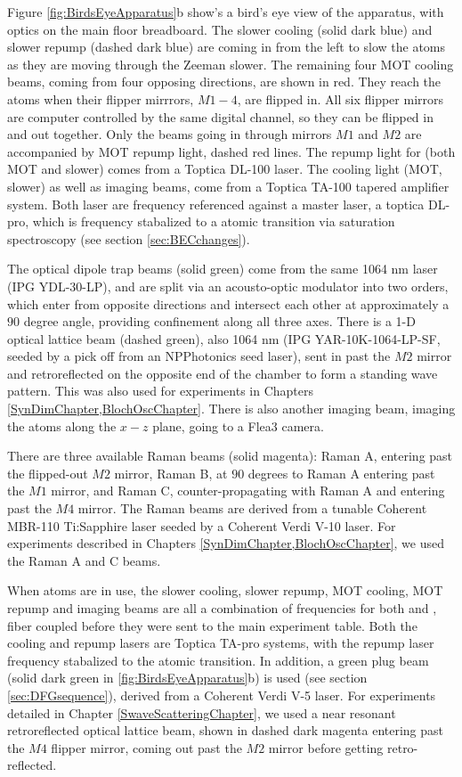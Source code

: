 Figure \ref{fig:BirdsEyeApparatus}b show's a bird's eye view of the apparatus, with optics on the main floor breadboard. The slower cooling (solid dark blue) and slower repump (dashed dark blue) are coming in from the left to slow the atoms as they are moving through the Zeeman slower. The remaining four MOT cooling beams, coming from four opposing directions, are shown in red.  They reach the atoms when their flipper mirrrors, $M1-4$, are flipped in. All six flipper mirrors are computer controlled by the same digital channel, so they can be flipped in and out together. Only the beams going in through mirrors $M1$ and $M2$ are accompanied by MOT repump light, dashed red lines. The repump light for \Rb{} (both MOT and slower) comes from a Toptica DL-100 laser. The cooling light (MOT, slower) as well as imaging beams, come from a Toptica TA-100 tapered amplifier system. Both laser are frequency referenced against a master laser, a toptica DL-pro, which is frequency stabalized to a \Rb{} atomic transition via saturation spectroscopy (see section \ref{sec:BECchanges}).

The optical dipole trap beams (solid green) come from the same 1064 nm laser (IPG YDL-30-LP), and are split via an acousto-optic modulator into two orders, which enter from opposite directions and intersect each other at approximately a $90$ degree angle, providing confinement along all three axes.  There is a 1-D optical lattice beam (dashed green), also 1064 nm (IPG YAR-10K-1064-LP-SF, seeded by a pick off from an NPPhotonics seed laser), sent in past the $M2$ mirror and retroreflected on the opposite end of the chamber to form a standing wave pattern. This was also used for experiments in Chapters \ref{SynDimChapter,BlochOscChapter}. There is also another imaging beam, imaging the atoms along the $x-z$ plane, going to a Flea3 camera. 

There are three available Raman beams (solid magenta): Raman A, entering past the flipped-out $M2$ mirror, Raman B, at $90$ degrees to Raman A entering past the $M1$ mirror, and Raman C, counter-propagating with Raman A and entering past the $M4$ mirror. The Raman beams are derived from a tunable Coherent MBR-110 Ti:Sapphire laser seeded by a Coherent Verdi V-10 laser. For experiments described in Chapters \ref{SynDimChapter,BlochOscChapter}, we used the Raman A and C beams.

When \K{} atoms are in use, the slower cooling, slower repump, MOT cooling, MOT repump and imaging beams are all a combination of frequencies for both \Rb{} and \K{}, fiber coupled before they were sent to the main experiment table. Both the \K{} cooling and repump lasers are Toptica TA-pro systems, with the repump laser frequency stabalized to the \K{} atomic transition. In addition, a green plug beam (solid dark green in \ref{fig:BirdsEyeApparatus}b) is used (see section \ref{sec:DFGsequence}), derived from a Coherent Verdi V-5 laser. For \K{} experiments detailed in Chapter \ref{SwaveScatteringChapter}, we used a near resonant retroreflected optical lattice beam, shown in dashed dark magenta entering past the $M4$ flipper mirror, coming out past the $M2$ mirror before getting retro-reflected.

